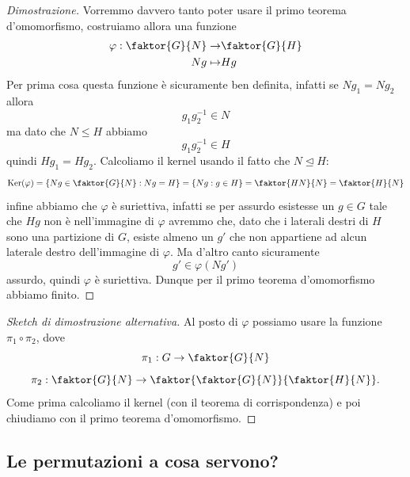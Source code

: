 \documentclass[11pt]{scrartcl}
\renewcommand{\ker}[1]{\text{Ker}\!\left(#1\right)}
\newcommand{\normal}{\mathrel{\unlhd}}
\begin{document}
	\begin{proof}[Dimostrazione]
		Vorremmo davvero tanto poter usare il primo teorema d'omomorfismo, costruiamo allora una funzione 
		\begin{align*}
			\varphi: \faktor{G}{N} \to & \faktor{G}{H} \\
								Ng	\mapsto & Hg
		\end{align*}
		Per prima cosa questa funzione è sicuramente ben definita, infatti se $Ng_1=Ng_2$ allora 
		$$g_1g_2^{-1}\in N$$
		ma dato che $N\le H$ abbiamo
		$$g_1g_2^{-1}\in H$$
		quindi $Hg_1=Hg_2$. Calcoliamo il kernel usando il fatto che $N\normal H$:
		$$\ker{\varphi}=\left\{Ng\in \faktor{G}{N}:Ng=H\right\}=\left\{Ng:g\in H\right\}=\faktor{HN}{N}=\faktor{H}{N}$$
		infine abbiamo che $\varphi$ è suriettiva, infatti se per assurdo esistesse un $g\in G$ tale che $Hg$ non è nell'immagine di $\varphi$ avremmo che, dato che i laterali destri di $H$ sono una partizione di $G$, esiste almeno un $g'$ che non appartiene ad alcun laterale destro dell'immagine di $\varphi$. Ma d'altro canto sicuramente 
		$$g'\in \varphi(Ng')$$
		assurdo, quindi $\varphi$ è suriettiva. Dunque per il primo teorema d'omomorfismo abbiamo finito.
	\end{proof}
	\begin{proof}[Sketch di dimostrazione alternativa]
		Al posto di $\varphi$ possiamo usare la funzione $\pi_1\circ \pi_2$, dove
		$$\pi_1:G\to\faktor{G}{N}$$
		$$\pi_2:\faktor{G}{N}\to\faktor{\faktor{G}{N}}{\faktor{H}{N}}.$$
		Come prima calcoliamo il kernel (con il teorema di corrispondenza) e poi chiudiamo con il primo teorema d'omomorfismo.
	\end{proof}
	\subsection{Le permutazioni a cosa servono?}
	
\end{document}
